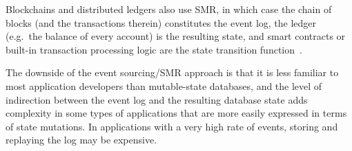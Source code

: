 \documentclass[sigconf]{acmart}
\begin{document}
Blockchains and distributed ledgers also use SMR, in which case the chain of blocks (and the transactions therein) constitutes the event log, the ledger (e.g.\ the balance of every account) is the resulting state, and smart contracts or built-in transaction processing logic are the state transition function~\cite{Vukolic:2015}.

The downside of the event sourcing/SMR approach is that it is less familiar to most application developers than mutable-state databases, and the level of indirection between the event log and the resulting database state adds complexity in some types of applications that are more easily expressed in terms of state mutations.
In applications with a very high rate of events, storing and replaying the log may be expensive.

\begin{figure}
  \centering\vspace{2em}
\end{figure}
\end{document}
